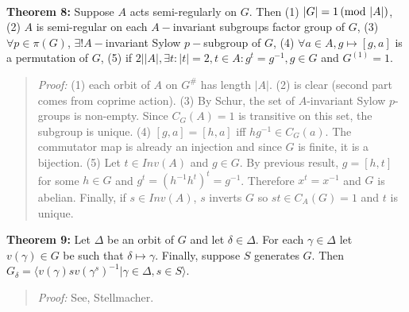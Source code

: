 \\
{\bf Theorem 8:}
Suppose $A$ acts semi-regularly
on $G$.  Then (1) $|G| = 1 \thinspace \textnormal{(mod } |A| \textnormal{)}$, (2) $A$ is semi-regular on each $A-$invariant
subgroups factor group of $G$, (3) $\forall p \in \pi(G)$, $\exists! A-$invariant
Sylow $p-$subgroup of $G$, (4) $\forall a \in A, g \mapsto [g,a]$ is a permutation of
$G$, (5) if $2 | |A|, \exists t: |t|=2, t \in A: g^t = g^{-1}, g \in G$ and
$G^{(1)}=1$.
\begin{quote}
\emph{Proof:}  
(1) each orbit of $A$ on $G^{\#}$ has length $|A|$.  (2) is clear (second part comes from coprime action).
(3) By Schur, the set of $A$-invariant Sylow $p$-groups is non-empty.  Since $C_G(A)= 1$ is transitive on this
set, the subgroup is unique. (4) $[g,a]= [h,a]$ iff $h g^{-1} \in C_G(a)$.  The commutator map is already an
injection and since $G$ is finite, it is a bijection. (5)  Let $t \in Inv(A)$ and $g \in G$.  By previous result,
$g= [h,t]$ for some $h \in G$ and $g^t = (h^{-1} h^t)^t= g^{-1}$.  Therefore $x^t =x^{-1}$ and $G$ is abelian.
Finally, if $s \in Inv(A)$, $s$ inverts $G$ so $st \in C_A(G)=1$ and $t$ is unique.
\end{quote}
{\bf Theorem 9:}
Let $\Delta$ be an orbit of $G$ and let $\delta \in \Delta$.  For each $\gamma \in \Delta$
let $v(\gamma ) \in G$ be such that $\delta \mapsto \gamma$.  Finally, suppose $S$
generates $G$.  
Then $G_{\delta}= \langle v(\gamma)sv(\gamma^{s})^{-1} | \gamma \in \Delta, s \in S \rangle$.
\begin{quote}
\emph{Proof:}  
See, Stellmacher.
\end{quote}

